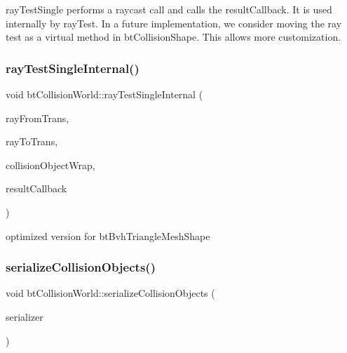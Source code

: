 ray\+Test\+Single performs a raycast call and calls the result\+Callback. It is used internally by ray\+Test. In a future implementation, we consider moving the ray test as a virtual method in bt\+Collision\+Shape. This allows more customization. \mbox{\label{classbtCollisionWorld_a84bbeea09de9dc5c68e49826e58f7114}} 
\subsubsection{\texorpdfstring{ray\+Test\+Single\+Internal()}{rayTestSingleInternal()}}
{\footnotesize\ttfamily void bt\+Collision\+World\+::ray\+Test\+Single\+Internal (\begin{DoxyParamCaption}\item[{const bt\+Transform \&}]{ray\+From\+Trans,  }\item[{const bt\+Transform \&}]{ray\+To\+Trans,  }\item[{const \hyperlink{structbtCollisionObjectWrapper}{bt\+Collision\+Object\+Wrapper} $\ast$}]{collision\+Object\+Wrap,  }\item[{\hyperlink{structbtCollisionWorld_1_1RayResultCallback}{Ray\+Result\+Callback} \&}]{result\+Callback }\end{DoxyParamCaption})\hspace{0.3cm}{\ttfamily [static]}}

optimized version for bt\+Bvh\+Triangle\+Mesh\+Shape \mbox{\label{classbtCollisionWorld_aeed5861d66035fa72f40e27b04bdc056}} 
\subsubsection{\texorpdfstring{serialize\+Collision\+Objects()}{serializeCollisionObjects()}}
{\footnotesize\ttfamily void bt\+Collision\+World\+::serialize\+Collision\+Objects (\begin{DoxyParamCaption}\item[{\hyperlink{classbtSerializer}{bt\+Serializer} $\ast$}]{serializer }\end{DoxyParamCaption})\hspace{0.3cm}{\ttfamily [protected]}}

